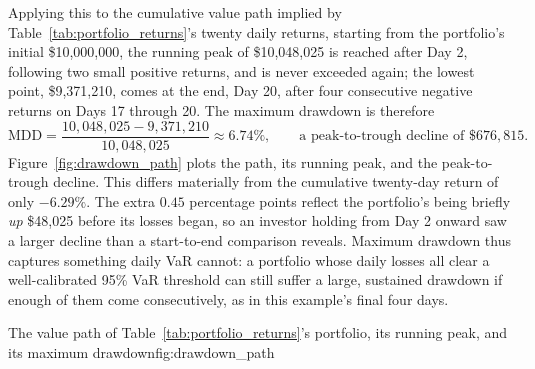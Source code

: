 \documentclass[../ai_in_finance]{subfiles}
\begin{document}
Applying this to the cumulative value path implied by Table~\ref{tab:portfolio_returns}'s twenty daily returns, starting from the portfolio's initial \$10,000,000, the running peak of \$10,048,025 is reached after Day 2, following two small positive returns, and is never exceeded again; the lowest point, \$9,371,210, comes at the end, Day 20, after four consecutive negative returns on Days 17 through 20. The maximum drawdown is therefore
\begin{equation*}
\text{MDD} = \frac{10{,}048{,}025 - 9{,}371{,}210}{10{,}048{,}025} \approx 6.74\%, \qquad \text{a peak-to-trough decline of } \$676{,}815.
\end{equation*}
Figure~\ref{fig:drawdown_path} plots the path, its running peak, and the peak-to-trough decline.
This differs materially from the cumulative twenty-day return of only $-6.29\%$. The extra $0.45$ percentage points reflect the portfolio's being briefly \emph{up} \$48,025 before its losses began, so an investor holding from Day 2 onward saw a larger decline than a start-to-end comparison reveals.
Maximum drawdown thus captures something daily VaR cannot: a portfolio whose daily losses all clear a well-calibrated 95\% VaR threshold can still suffer a large, sustained drawdown if enough of them come consecutively, as in this example's final four days.

\begin{bookfigure}[htbp]{The value path of Table~\ref{tab:portfolio_returns}'s portfolio, its running peak, and its maximum drawdown}{fig:drawdown_path}
\end{bookfigure}
\end{document}
